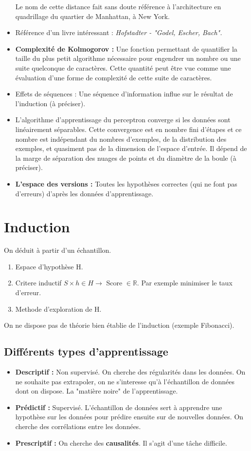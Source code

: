 \documentclass{article}
\begin{document}
\begin{itemize}
Le nom de cette distance fait sans doute référence à l'architecture en quadrillage du quartier de Manhattan, à New York.

\item Référence d'un livre intéressant : \textit{Hofstadter - "Godel, Escher, Bach".}
\item \textbf{Complexité de Kolmogorov :} Une fonction permettant de quantifier la taille du plus petit algorithme nécessaire pour engendrer un nombre ou une suite quelconque de caractères. Cette quantité peut être vue comme une évaluation d'une forme de complexité de cette suite de caractères.
\item Effets de séquences : Une séquence d'information influe sur le résultat de l'induction (à préciser).
\item L'algorithme d'apprentissage du perceptron converge si les données sont linéairement séparables. Cette convergence est en nombre fini d'étapes et ce nombre est indépendant du nombres d'exemples, de la distribution des exemples, et quasiment pas de la dimension de l'espace d'entrée. Il dépend de la marge de séparation des nuages de points et du diamètre de la boule (à préciser).
\item \textbf{L'espace des versions :} Toutes les hypothèses correctes (qui ne font pas d'erreurs) d'après les données d'apprentissage.
\end{itemize}

\section{Induction}

On déduit à partir d'un échantillon.

\begin{enumerate}
\item Espace d'hypothèse H.
\item Critere inductif $ S \times h \in H \rightarrow $ Score $\in \mathbb{R}$. Par exemple minimiser le taux d'erreur.
\item Methode d'exploration de H.
\end{enumerate}

On ne dispose pas de théorie bien établie de l'induction (exemple Fibonacci).

\subsection{Différents types d'apprentissage}
\begin{itemize}
\item \textbf{Descriptif :} Non supervisé. On cherche des régularités dans les données. On ne souhaite pas extrapoler, on ne s'interesse qu'à l'échantillon de données dont on dispose. La "matière noire" de l'apprentissage.
\item \textbf{Prédictif :} Supervisé. L'échantillon de données sert à apprendre une hypothèse sur les données pour prédire ensuite sur de nouvelles données. On cherche des corrélations entre les données.
\item \textbf{Prescriptif :} On cherche des \textbf{causalités}. Il s'agit d'une tâche difficile.
\end{itemize}
\end{document}
